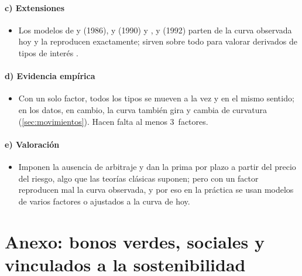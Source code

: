 \documentclass[11pt]{article}
\begin{document}
\paragraph{c) Extensiones}
\begin{itemize}
\item Los modelos de  y  (1986),  y  (1990) y ,  y  (1992) parten de la curva observada hoy y la reproducen exactamente; sirven sobre todo para valorar derivados de tipos de interés\nocite{Hull2022Options} .
\end{itemize}

\paragraph{d) Evidencia empírica}
\begin{itemize}
\item Con un solo factor, todos los tipos se mueven a la vez y en el mismo sentido; en los datos, en cambio, la curva también gira y cambia de curvatura (\ref{sec:movimientos}). Hacen falta al menos 3~factores.
\end{itemize}

\paragraph{e) Valoración}
\begin{itemize}
\item Imponen la ausencia de arbitraje y dan la prima por plazo a partir del precio del riesgo, algo que las teorías clásicas suponen; pero con un factor reproducen mal la curva observada, y por eso en la práctica se usan modelos de varios factores o ajustados a la curva de hoy.
\end{itemize}

\section{Anexo: bonos verdes, sociales y vinculados\cortetitulo{} a la sostenibilidad}\label{anexo:verdes}
\end{document}
